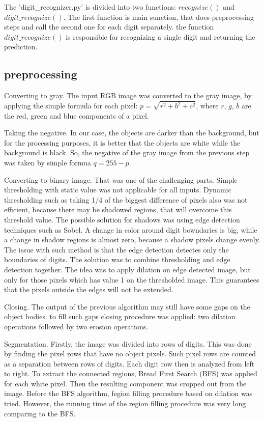 \documentclass[conference]{IEEEtran}
\begin{document}
The 'digit\_recognizer.py' is divided into two functions: $recognize()$ and $digit\_recognize()$. The first function is main sunction, that does preprocessing steps and call the second one for each digit separately. the function $digit\_recognize()$ is responsible for recognizing a single digit and returning the prediction.

\subsection{preprocessing}


Converting to gray. The input RGB image was converted to the gray image, by applying the simple formula for each pixel: $p = \sqrt{r^2 + b^2 + c^2}$, where $r$, $g$, $b$ are the red, green and blue components of a pixel.

Taking the negative. In our case, the objects are darker than the background, but for the processing purposes, it is better that the objects are white while the background is black. So, the negative of the gray image from the previous step was taken by simple formua $q = 255-p$.

Converting to binary image. That was one of the challenging parts. Simple thresholding with static value was not applicable for all inputs. Dynamic thresholding such as taking 1/4 of the biggest difference of pixels also was not efficient, because there may be shadowed regions, that will overcome this threshold value. 
The possible solution for shadows was using edge detection techniques such as Sobel. A change in color around digit bowndaries is big, while a change in shadow regions is almost zero, because a shadow pixels change evenly. The issue with such method is that the edge detection detectes only the boundaries of digits.
The solution was to combine thresholding and edge detection together. The idea was to apply dilation on edge detected image, but only for those pixels which has value 1 on the thresholded image. This guarantees that the pixels outside the edges will not be extended.

Closing. The output of the previous algorithm may still have some gaps on the object bodies. to fill such gaps closing procedure was applied: two dilation operations followed by two erosion operations.

Segmentation. Firstly, the image was divided into rows of digits. This was done by finding the pixel rows that have no object pixels. Such pixel rows are counted as a separation between rows of digits.
Each digit row then is analyzed from left to right. To extract the connected regions, Bread First Search (BFS) was applied for each white pixel. Then the resulting component was cropped out from the image. Before the BFS algorithm, fegion filling procedure based on dilation was tried. However, the running time of the region filling procedure was very long comparing to the BFS.
\end{document}
